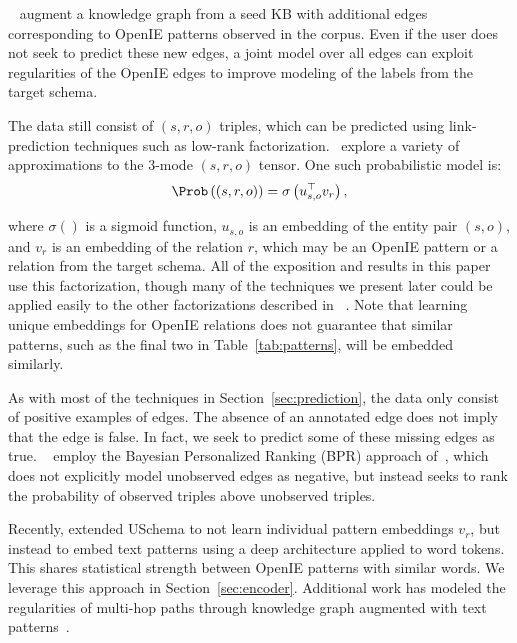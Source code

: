 ~\citet{limin} augment a knowledge graph from a seed KB with additional edges corresponding to OpenIE patterns observed in the corpus. Even if the user does not seek to predict these new edges, a joint model over all edges can exploit regularities of the OpenIE edges to improve modeling of the labels from the target schema. 

The data still consist of $(s,r,o)$ triples, which can be predicted using link-prediction techniques such as low-rank factorization.~\citet{limin} explore a variety of approximations to the 3-mode $(s,r,o)$ tensor. One such probabilistic model is:
\vspace{-.1cm}
\begin{equation}
\Prob \left((s,r,o)\right) = \sigma\left( u_{s,o}^\top v_r \right), \label{eq:US-prob}
\end{equation}
\vspace{-.5cm}

where  $\sigma()$ is a sigmoid function, $u_{s,o}$ is an embedding of the entity pair $(s,o)$, and $v_r$ is an embedding of the relation $r$, which may be an OpenIE pattern or a relation from the target schema. All of the exposition and results in this paper use this factorization, though many of the techniques we present later could be applied easily to the other factorizations described in ~\citet{limin}. Note that learning unique embeddings for OpenIE relations does not guarantee that similar patterns, such as the final two in Table~\ref{tab:patterns}, will be embedded similarly.

As with most of the techniques in Section~\ref{sec:prediction}, the data only consist of positive examples of edges. The absence of an annotated edge does not imply that the edge is false. In fact, we seek to predict some of these missing edges as true. ~\citet{limin} employ the Bayesian Personalized Ranking (BPR) approach of~\citet{rendle2009bpr}, which does not explicitly model unobserved edges as negative, but instead seeks to rank the probability of observed triples above unobserved triples.


Recently, \citet{toutanova2015representing} extended USchema to not learn individual pattern embeddings $v_r$, but instead to embed text patterns using a deep architecture applied to word tokens. This shares statistical strength between OpenIE patterns with similar words. We leverage this approach in Section~\ref{sec:encoder}. Additional work has modeled the regularities of multi-hop paths through knowledge graph augmented with text patterns~\citep{pra,pra_second,vector_pra,neelakantan2015compositional}.

